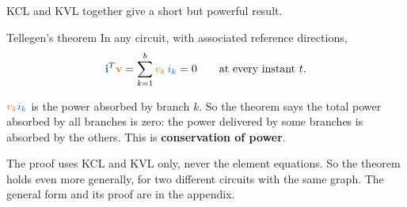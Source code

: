 \documentclass[11pt,a4paper]{article}
\newcommand{\Icol}[1]{\textcolor{ccur}{#1}}
\newcommand{\Vcol}[1]{\textcolor{cvolt}{#1}}
\begin{document}
KCL and KVL together give a short but powerful result.

\begin{definitionbox}{Tellegen's theorem}
In any circuit, with associated reference directions,
\[
  \Icol{\mathbf{i}}^T\Vcol{\mathbf{v}} = \sum_{k=1}^{b} \Vcol{v_k}\,\Icol{i_k} = 0
  \qquad \text{at every instant } t.
\]
\end{definitionbox}

$\Vcol{v_k}\Icol{i_k}$ is the power absorbed by branch $k$. So the theorem says the total
power absorbed by all branches is zero: the power delivered by some branches is absorbed by
the others. This is \textbf{conservation of power}.

The proof uses KCL and KVL only, never the element equations. So the theorem holds even more
generally, for two different circuits with the same graph. The general form and its proof
are in the appendix.
\end{document}
